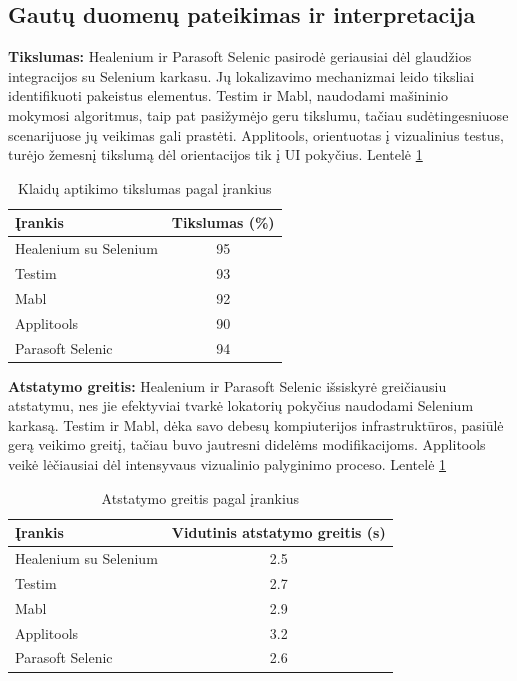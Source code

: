 \documentclass[
]{VUMIFPSkursinis}
\begin{document}
\subsection{Gautų duomenų pateikimas ir interpretacija}

\textbf{Tikslumas:} Healenium ir Parasoft Selenic pasirodė geriausiai dėl glaudžios integracijos su Selenium karkasu. Jų lokalizavimo mechanizmai leido tiksliai identifikuoti pakeistus elementus. Testim ir Mabl, naudodami mašininio mokymosi algoritmus, taip pat pasižymėjo geru tikslumu, tačiau sudėtingesniuose scenarijuose jų veikimas gali prastėti. Applitools, orientuotas į vizualinius testus, turėjo žemesnį tikslumą dėl orientacijos tik į UI pokyčius. Lentelė \ref{tab:Klaidų aptikimo tikslumas pagal įrankius}

\begin{table}[H]\footnotesize
  \centering
  \caption{Klaidų aptikimo tikslumas pagal įrankius}
  {\begin{tabular}{|l|c|} \hline
    Įrankis & Tikslumas (\%) \\
    \hline
    Healenium su Selenium & 95             \\
    Testim                & 93             \\
    Mabl                  & 92             \\
    Applitools            & 90             \\
    Parasoft Selenic      & 94             \\
    \hline
  \end{tabular}}
  \label{tab:Klaidų aptikimo tikslumas pagal įrankius}
\end{table}

\textbf{Atstatymo greitis:} Healenium ir Parasoft Selenic išsiskyrė greičiausiu atstatymu, nes jie efektyviai tvarkė lokatorių pokyčius naudodami Selenium karkasą. Testim ir Mabl, dėka savo debesų kompiuterijos infrastruktūros, pasiūlė gerą veikimo greitį, tačiau buvo jautresni didelėms modifikacijoms. Applitools veikė lėčiausiai dėl intensyvaus vizualinio palyginimo proceso. Lentelė \ref{tab:Klaidų aptikimo tikslumas pagal įrankius}

\begin{table}[H]\footnotesize
  \centering
  \caption{Atstatymo greitis pagal įrankius}
  {\begin{tabular}{|l|c|} \hline
    Įrankis & Vidutinis atstatymo greitis (s) \\
    \hline
    Healenium su Selenium & 2.5             \\
    Testim                & 2.7            \\
    Mabl                  & 2.9            \\
    Applitools            & 3.2             \\
    Parasoft Selenic      & 2.6             \\
    \hline
  \end{tabular}}
  \label{tab:Atstatymo greitis}
\end{table}
\end{document}
